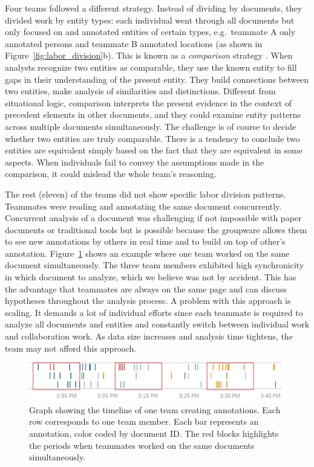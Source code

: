 Four teams followed a different strategy. Instead of dividing by documents, they divided work by entity types: each individual went through all documents but only focused on and annotated
entities of certain types, e.g.~teammate A only annotated persons and
teammate B annotated locations (as shown in
Figure~\ref{fig:labor_division}b). This is known as a \textit{comparison} strategy \citep{Heuer1999}. When analysts recognize two entities as comparable, they use the known entity to fill gaps in their understanding of the present entity. They build connections between two entities, make analysis of similarities and distinctions. Different from situational logic, comparison interprets the present evidence in the context of precedent elements in other documents, and they could examine entity patterns across multiple documents simultaneously. The challenge is of course to decide whether two entities are truly comparable. There is a tendency to conclude two entities are equivalent simply based on the fact that they are equivalent in some aspects. When individuals fail to convey the assumptions made in the comparison, it could mislead the whole team's reasoning.

The rest (eleven) of the teams did not show specific labor division
patterns. Teammates were reading and annotating
the same document concurrently. Concurrent analysis of a document was challenging if not impossible with paper documents or traditional tools but is possible because the groupware allows them to see new annotations by others in
real time and to build on top of other's annotation. Figure~\ref{fig:close_collaboration}
shows an example where one team worked on the same document simultaneously.
The three team members exhibited high synchronicity in which document to
analyze, which we believe was not by accident. This has the advantage that
teammates are always on the same page and can discuss hypotheses
throughout the analysis process. A problem with this approach is scaling. It demands a lot of individual efforts since each teammate is required to analyze all documents and entities and constantly switch between individual work and collaboration work. As data size increases and analysis time tightens, the team may not afford this approach.


\begin{figure}
	\centering
	\includegraphics[width=\columnwidth]{04-Study_one/img/close_collaboration.jpg}
	\caption{Graph showing the timeline of one team creating annotations.
		Each row corresponds to one team member. Each bar represents an
		annotation, color coded by document ID. The red blocks highlights the
		periods when teammates worked on the same documents
		simultaneously.\label{fig:close_collaboration}}
\end{figure}



